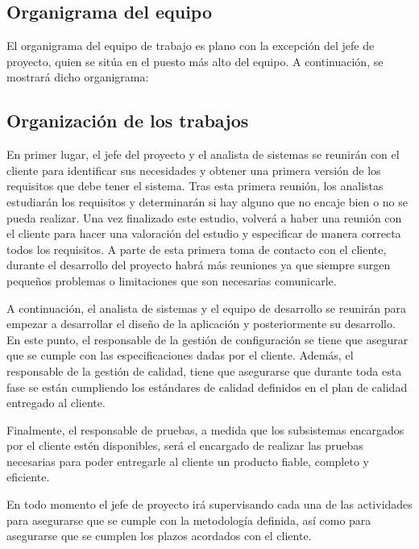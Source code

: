 \subsection {Organigrama del equipo}
\par El organigrama del equipo de trabajo es plano con la excepción del jefe de proyecto, quien se sitúa en el puesto más alto del equipo. A continuación, se mostrará dicho organigrama:

\subsection {Organización de los trabajos}
\par En primer lugar, el jefe del proyecto y el analista de sistemas se reunirán con el cliente para identificar sus necesidades y obtener una primera versión de los requisitos que debe tener el sistema. Tras esta primera reunión, los analistas estudiarán los requisitos y determinarán si hay alguno que no encaje bien o no se pueda realizar. Una vez finalizado este estudio, volverá a haber una reunión con el cliente para hacer una valoración del estudio y especificar de manera correcta todos los requisitos. A parte de esta primera toma de contacto con el cliente, durante el desarrollo del proyecto habrá más reuniones ya que siempre surgen pequeños problemas o limitaciones que son necesarias comunicarle.
\par A continuación, el analista de sistemas y el equipo de desarrollo se reunirán para empezar a desarrollar el diseño de la aplicación y posteriormente su desarrollo. En este punto, el responsable de la gestión de configuración se tiene que asegurar que se cumple con las especificaciones dadas por el cliente. Además, el responsable de la gestión de calidad, tiene que asegurarse que durante toda esta fase se están cumpliendo los estándares de calidad definidos en el plan de calidad entregado al cliente.
\par Finalmente, el responsable de pruebas, a medida que los subsistemas encargados por el cliente estén disponibles, será el encargado de realizar las pruebas necesarias para poder entregarle al cliente un producto fiable, completo y eficiente.
\par En todo momento el jefe de proyecto irá supervisando cada una de las actividades para asegurarse que se cumple con la metodología definida, así como para asegurarse que se cumplen los plazos acordados con el cliente.
